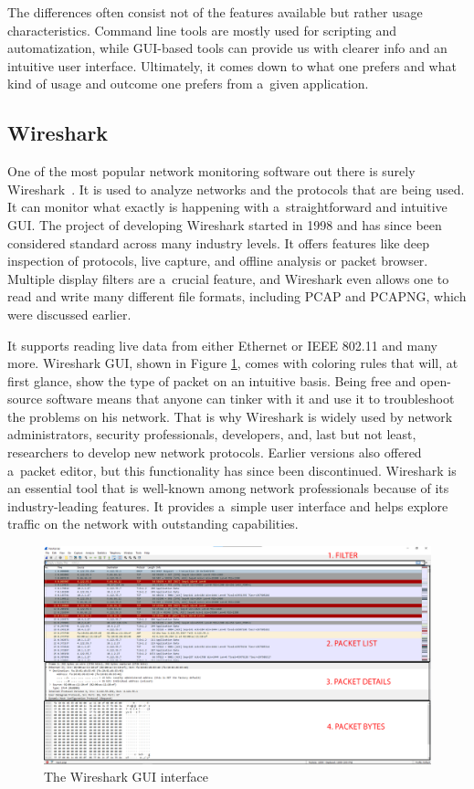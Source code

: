 \documentclass[
  printed,     %
  color,       %
  oneside,     %
  nosansbold,  %
  nocolorbold, %
  nolof,         %
  nolot,         %
]{fithesis4}
\begin{document}
The differences often consist not of the features available but rather usage characteristics. Command line tools are mostly used for scripting and automatization, while GUI-based tools can provide us with clearer info and an intuitive user interface. Ultimately, it comes down to what one prefers and what kind of usage and outcome one prefers from a~given application.

\subsection{Wireshark}

One of the most popular network monitoring software out there is surely Wireshark~\cite{Wireshar89:online}. It is used to analyze networks and the protocols that are being used. It can monitor what exactly is happening with a~straightforward and intuitive GUI. The project of developing Wireshark started in 1998 and has since been considered standard across many industry levels. It offers features like deep inspection of protocols, live capture, and offline analysis or packet browser. Multiple display filters are a~crucial feature, and Wireshark even allows one to read and write many different file formats, including PCAP and PCAPNG, which were discussed earlier. 

It supports reading live data from either Ethernet or IEEE 802.11 and many more. Wireshark GUI, shown in Figure \ref{fig:wireshark}, comes with coloring rules that will, at first glance, show the type of packet on an intuitive basis. Being free and open-source software means that anyone can tinker with it and use it to troubleshoot the problems on his network. That is why Wireshark is widely used by network administrators, security professionals, developers, and, last but not least, researchers to develop new network protocols. Earlier versions also offered a~packet editor, but this functionality has since been discontinued. Wireshark is an essential tool that is well-known among network professionals because of its industry-leading features. It provides a~simple user interface and helps explore traffic on the network with outstanding capabilities.

\begin{figure}[h]
  \begin{center}
    \includegraphics[width=1\textwidth]{images/wireshark_text.png}
  \end{center}
  \caption{The Wireshark GUI interface}
  \label{fig:wireshark}
\end{figure}
\end{document}
